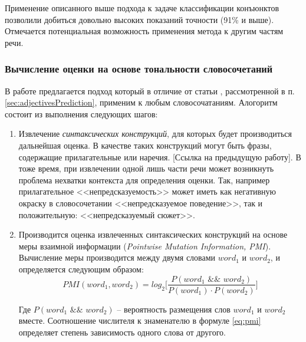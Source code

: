         Применение описанного выше подхода к задаче классификации конъюнктов
        позволили добиться довольно высоких показаний точности (91\% и выше).
        Отмечается потенциальная возможность применения метода к другим
        частям речи.

        \subsubsection{Вычисление оценки на основе тональности словосочетаний}
        \label{sec:soEvaluation}
        В работе \cite{lexiconSO} предлагается подход который в отличие от
        статьи \cite{lexiconAdjectives}, рассмотренной в п. \ref{sec:adjectivesPrediction},
        применим к любым словосочатаниям. Алогоритм состоит из выполнения следующих шагов:
        \begin{enumerate}
            \item Извлечение {\it синтаксических конструкций}, для которых будет производиться
                дальнейшая оценка. В качестве таких конструкций могут быть фразы, содержащие
                прилагательные или наречия. [Ссылка на предыдущую работу]. В тоже время,
                при извлечении одной лишь части речи может возникнуть проблема нехватки контекста
                для определения оценки. Так, например прилагательное <<непредсказуемость>>
                может иметь как негативную окраску в словосочетании <<непредсказуемое поведение>>,
                так и положительную: <<непредсказуемый сюжет>>.
            \item Производится оценка извлеченных синтаксических конструкций на основе
                меры взаимной информации ({\it Pointwise Mutation Information, PMI}).
                Вычисление меры производится между двумя словами $word_1$ и $word_2$,
                и определяется следующим образом:
                \begin{equation}
                    \label{eq:pmi}
                    PMI(word_1, word_2) = log_2 \Bigg[ \dfrac{P(word_1 \hspace{4pt} \&\& \hspace{4pt} word_2)}{P(word_1) \cdot P(word_2)} \Bigg]
                \end{equation}

                Где $P(word_1 \hspace{4pt} \&\& \hspace{4pt} word_2)$ -- вероятность
                размещения слов $word_1$ и $word_2$ вместе. Соотношение числителя
                к знаменателю в формуле \ref{eq:pmi} определяет степень зависимость одного
                слова от другого.


\end{enumerate}
